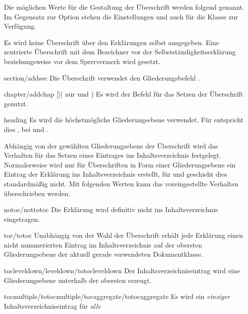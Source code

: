 \begin{Declaration*}{}
\begin{Declaration*}{}
\begin{Declaration*}{}
\begin{Declaration}
Die möglichen Werte für die Gestaltung der Überschrift werden folgend genannt. 
Im Gegensatz zur Option  stehen die Einstellungen 
 und  auch für die Klasse 
 zur Verfügung.
%
\begin{values}{}
\itemfalse
  Es wird keine Überschrift über den Erklärungen selbst ausgegeben.
\itemtrue*
  Eine zentrierte Überschrift mit dem Bezeichner  vor 
  der Selbstständigkeitserklärung beziehungsweise  vor dem 
  Sperrvermerk wird gesetzt. 
\item[section/addsec]
  Die Überschrift verwendet den Gliederungsbefehl .
\item[chapter/addchap][\Class{tudscrbook}](%
    nur  und %
  )
  Es wird der Befehl  für das Setzen der Überschrift genutzt. 
\item[heading]
  Es wird die höchstmögliche Gliederungsebene verwendet. Für 
   entspricht dies , bei 
   und  .
\end{values}
%
Abhängig von der gewählten Gliederungsebene der Überschrift wird das Verhalten 
für das Setzen eines Eintrages ins Inhaltsverzeichnis festgelegt. Normalerweise 
wird nur für Überschriften in Form einer Gliederungsebene ein Eintrag der 
Erklärung ins Inhaltsverzeichnis erstellt, für  und 
 geschieht dies standardmäßig nicht. Mit folgenden 
Werten kann das voreingestellte Verhalten überschrieben werden.
%
\begin{values}{}
\item[notoc/nottotoc]
  Die Erklärung wird definitiv nicht ins Inhaltsverzeichnis eingetragen.
\item[toc/totoc]
  Unabhängig von der Wahl der Überschrift erhält jede Erklärung einen nicht
  nummerierten Eintrag im Inhaltsverzeichnis auf der obersten Gliederungsebene 
  der aktuell gerade verwendeten Dokumentklasse. 
\item[tocleveldown/leveldown/totocleveldown]
  Der Inhaltsverzeichniseintrag wird eine Gliederungsebene unterhalb der 
  obersten erzeugt.
\item[tocmultiple/totocmultiple/tocaggregate/totocaggregate]
  Es wird ein \emph{einziger} Inhaltsverzeichniseintrag für \emph{alle} 

\end{values}
\end{Declaration}
\end{Declaration*}
\end{Declaration*}
\end{Declaration*}
